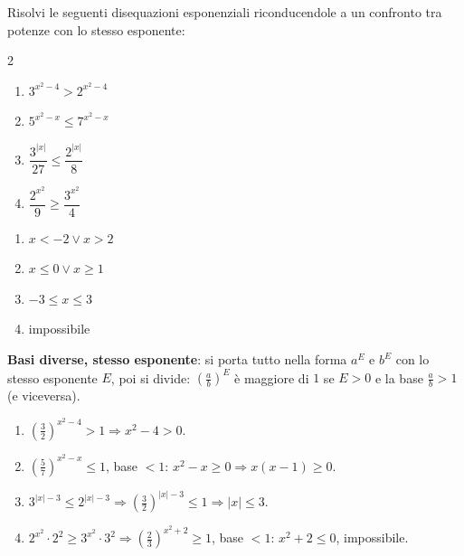 \begin{question}[ID=5.15, subtitle={Disequazioni con basi diverse, esponenti di secondo grado e moduli}, difficulty=difficile, tags={disequazioni, esponenziali, basi diverse, valore assoluto}]
Risolvi le seguenti disequazioni esponenziali riconducendole a un confronto tra potenze con lo stesso esponente:
\begin{center}\begin{minipage}{0.92\linewidth}
\begin{multicols}{2}
\begin{enumerate}[leftmargin=3.2cm]
\item $3^{x^2-4} > 2^{x^2-4}$
\item $5^{x^2-x} \leq 7^{x^2-x}$
\item $\dfrac{3^{|x|}}{27} \leq \dfrac{2^{|x|}}{8}$
\item $\dfrac{2^{x^2}}{9} \geq \dfrac{3^{x^2}}{4}$
\end{enumerate}
\end{multicols}
\end{minipage}\end{center}
\begin{solution}
\begin{enumerate}
    \item $x<-2\vee x>2$
    \item $x\leq0\vee x\geq1$
    \item $-3\leq x\leq3$
    \item impossibile
\end{enumerate}
\end{solution}
\begin{explanation}
\textbf{Basi diverse, stesso esponente}: si porta tutto nella forma $a^{E}$ e $b^{E}$ con lo stesso esponente $E$, poi si divide: $\left(\tfrac ab\right)^{E}$ è maggiore di $1$ se $E>0$ e la base $\tfrac ab>1$ (e viceversa).
\begin{enumerate}
    \item $\left(\tfrac32\right)^{x^2-4}>1 \Rightarrow x^2-4>0$.
    \item $\left(\tfrac57\right)^{x^2-x}\leq1$, base $<1$: $x^2-x\geq0 \Rightarrow x(x-1)\geq0$.
    \item $3^{|x|-3}\leq2^{|x|-3} \Rightarrow \left(\tfrac32\right)^{|x|-3}\leq1 \Rightarrow |x|\leq3$.
    \item $2^{x^2}\cdot2^2\geq3^{x^2}\cdot3^2 \Rightarrow \left(\tfrac23\right)^{x^2+2}\geq1$, base $<1$: $x^2+2\leq0$, impossibile.
\end{enumerate}
\end{explanation}
\end{question}

